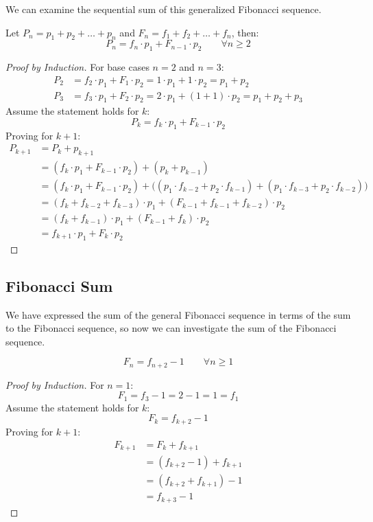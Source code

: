 We can examine the sequential sum of this generalized Fibonacci sequence.

\begin{theorem}
Let $P_n = p_1 + p_2 + \dots + p_n$ and $F_n = f_1 + f_2 + \dots + f_n$, then:
\[
P_n = f_n \cdot p_1 + F_{n-1} \cdot p_2  \qquad \forall n \geq 2
\]
\end{theorem}

\begin{proof}[Proof by Induction]
For base cases $n=2$ and $n=3$:
\begin{align*}
P_2 &= f_2 \cdot p_1 + F_{1} \cdot p_2 = 1 \cdot p_1 + 1 \cdot p_2 = p_1 + p_2 \\
P_3 &= f_3 \cdot p_1 + F_{2} \cdot p_2 = 2 \cdot p_1 + (1+1) \cdot p_2 = p_1 + p_2 + p_3
\end{align*}
Assume the statement holds for $k$:
\[
P_k = f_k \cdot p_1 + F_{k-1} \cdot p_2
\]
Proving for $k+1$:
\begin{align*}
P_{k+1} &= P_k + p_{k+1} \\
        &= (f_k \cdot p_1 + F_{k-1} \cdot p_2) + (p_k + p_{k-1}) \\
        &= (f_k \cdot p_1 + F_{k-1} \cdot p_2) + \bigl( (p_1 \cdot f_{k-2} + p_2 \cdot f_{k-1}) + (p_1 \cdot f_{k-3} + p_2 \cdot f_{k-2}) \bigr) \\
        &= (f_k + f_{k-2} + f_{k-3})\cdot p_1 + (F_{k-1} + f_{k-1} + f_{k-2}) \cdot p_2 \\
        &= (f_k + f_{k-1})\cdot p_1 + (F_{k-1} + f_{k}) \cdot p_2 \\
        &= f_{k+1}\cdot p_1 + F_{k} \cdot p_2
\end{align*}
\end{proof}

\subsection{Fibonacci Sum}\label{fib:subsec:fibonacci-sum}
We have expressed the sum of the general Fibonacci sequence in terms of the sum to the Fibonacci sequence, so now we can investigate the sum of the Fibonacci sequence.

\begin{theorem}
\[
F_n = f_{n+2} - 1 \qquad \forall n \geq 1
\]
\end{theorem}

\begin{proof}[Proof by Induction]
For $n=1$:
\[
F_1 = f_{3} - 1 = 2 - 1 = 1 = f_1
\]
Assume the statement holds for $k$:
\[
F_k = f_{k+2} - 1
\]
Proving for $k+1$:
\begin{align*}
F_{k+1} &= F_k + f_{k+1} \\
        &= (f_{k+2} - 1) + f_{k+1} \\
        &= (f_{k+2} + f_{k+1}) - 1 \\
        &= f_{k+3} - 1
\end{align*}
\end{proof}

